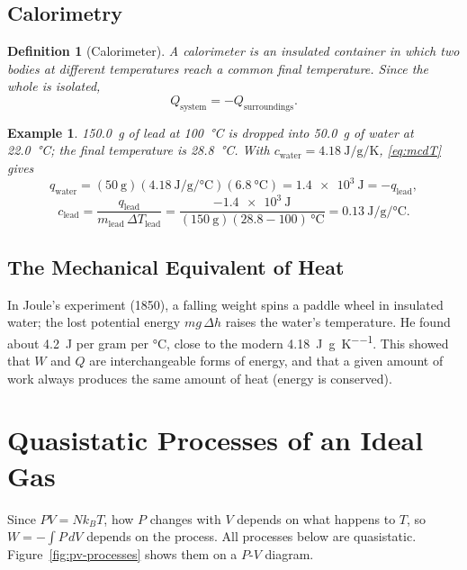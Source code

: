 \documentclass{article}
\newtheorem{definition}{Definition}
\newtheorem*{example}{Example}
\begin{document}
\subsection{Calorimetry}
\begin{definition}[Calorimeter]
    A calorimeter is an insulated container in which two bodies at different temperatures reach a common final temperature. Since the whole is isolated,
    \[Q_{\text{system}} = -Q_{\text{surroundings}}.\]
\end{definition}
\begin{example}
    \SI{150.0}{\gram} of lead at \SI{100}{\celsius} is dropped into \SI{50.0}{\gram} of water at \SI{22.0}{\celsius}; the final temperature is \SI{28.8}{\celsius}. With $c_{\text{water}} = \SI{4.18}{\joule\per\gram\per\kelvin}$, \eqref{eq:mcdT} gives
    \[q_{\text{water}} = (\SI{50}{\gram})(\SI{4.18}{\joule\per\gram\per\celsius})(\SI{6.8}{\celsius}) = \SI{1.4e3}{\joule} = -q_{\text{lead}},\]
    \[c_{\text{lead}} = \frac{q_{\text{lead}}}{m_{\text{lead}}\,\Delta T_{\text{lead}}} = \frac{-\SI{1.4e3}{\joule}}{(\SI{150}{\gram})(28.8 - 100)\,\si{\celsius}} = \SI{0.13}{\joule\per\gram\per\celsius}.\]
\end{example}

\subsection{The Mechanical Equivalent of Heat}
In Joule's experiment (1850), a falling weight spins a paddle wheel in insulated water; the lost potential energy $mg\,\Delta h$ raises the water's temperature. He found about \SI{4.2}{\joule} per gram per \si{\celsius}, close to the modern \SI{4.18}{\joule\per\gram\per\kelvin}. This showed that $W$ and $Q$ are interchangeable forms of energy, and that a given amount of work always produces the same amount of heat (energy is conserved).

\section{Quasistatic Processes of an Ideal Gas}

Since $PV = Nk_BT$, how $P$ changes with $V$ depends on what happens to $T$, so $W = -\int P\,dV$ depends on the process. All processes below are quasistatic. Figure~\ref{fig:pv-processes} shows them on a $P$-$V$ diagram.
\end{document}
